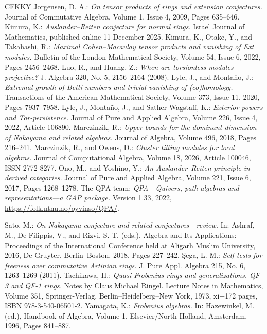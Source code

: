 \documentclass[a4paper]{amsart}
\theoremstyle{definition}
\theoremstyle{remark}
\numberwithin{equation}{section}
\begin{document}
\begin{thebibliography}{CFKKY}
 Jorgensen, D. A.: {\it On tensor products of rings and extension conjectures.} Journal of Commutative Algebra, Volume 1, Issue 4, 2009, Pages 635--646.
 Kimura, K.: {\it Auslander--Reiten conjecture for normal rings.} Israel Journal of Mathematics, published online 11 December 2025.
 Kimura, K., Otake, Y., and Takahashi, R.: {\it Maximal Cohen--Macaulay tensor products and vanishing of Ext modules.} Bulletin of the London Mathematical Society, Volume 54, Issue 6, 2022, Pages 2456--2468.
 Luo, R., and Huang, Z.: {\it When are torsionless modules projective?} J. Algebra 320, No. 5, 2156--2164 (2008).
 Lyle, J., and Monta\~no, J.: {\it Extremal growth of Betti numbers and trivial vanishing of (co)homology.} Transactions of the American Mathematical Society, Volume 373, Issue 11, 2020, Pages 7937--7958.
 Lyle, J., Monta\~no, J., and Sather-Wagstaff, K.: {\it Exterior powers and Tor-persistence.} Journal of Pure and Applied Algebra, Volume 226, Issue 4, 2022, Article 106890.
 Marczinzik, R.: {\it Upper bounds for the dominant dimension of Nakayama and related algebras.} Journal of Algebra, Volume 496, 2018, Pages 216--241.
 Marczinzik, R., and Owens, D.: {\it Cluster tilting modules for local algebras.} Journal of Computational Algebra, Volume 18, 2026, Article 100046, ISSN 2772-8277.
 Ono, M., and Yoshino, Y.: {\it An Auslander--Reiten principle in derived categories.} Journal of Pure and Applied Algebra, Volume 221, Issue 6, 2017, Pages 1268--1278.
 The QPA-team: {\it QPA---Quivers, path algebras and representations---a GAP package.} Version 1.33, 2022, \url{https://folk.ntnu.no/oyvinso/QPA/}.

 Sato, M.: {\it On Nakayama conjecture and related conjectures---review.} In: Ashraf, M., De Filippis, V., and Rizvi, S. T. (eds.), Algebra and Its Applications: Proceedings of the International Conference held at Aligarh Muslim University, 2016, De Gruyter, Berlin--Boston, 2018, Pages 227--242.
 \c{S}ega, L. M.: {\it Self-tests for freeness over commutative Artinian rings.} J. Pure Appl. Algebra 215, No. 6, 1263--1269 (2011).
 Tachikawa, H.: {\it Quasi-Frobenius rings and generalizations. QF-3 and QF-1 rings.} Notes by Claus Michael Ringel. Lecture Notes in Mathematics, Volume 351, Springer-Verlag, Berlin--Heidelberg--New York, 1973, xi+172 pages, ISBN 978-3-540-06501-2.
 Yamagata, K.: {\it Frobenius algebras.} In: Hazewinkel, M. (ed.), Handbook of Algebra, Volume 1, Elsevier/North-Holland, Amsterdam, 1996, Pages 841--887.
\end{thebibliography}
\end{document}
